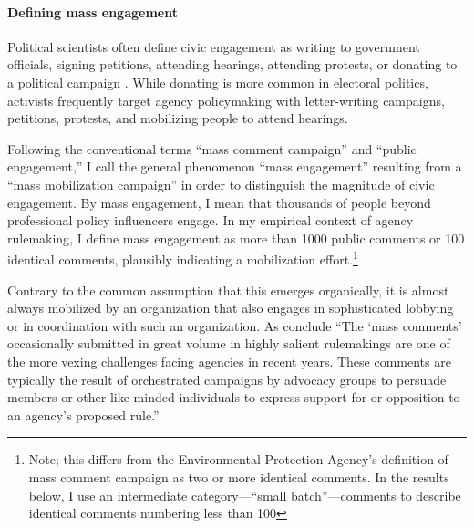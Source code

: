 \paragraph{Defining mass engagement}
Political scientists often define civic engagement as writing to government officials, signing petitions, attending hearings, attending protests, or donating to a political campaign \citep{Verba1987}. While donating is more common in electoral politics, activists frequently target agency policymaking with letter-writing campaigns, petitions, protests, and mobilizing people to attend hearings. 

Following the conventional terms ``mass comment campaign'' and ``public engagement,'' I call the general phenomenon ``mass engagement'' resulting from a ``mass mobilization campaign'' in order to distinguish the magnitude of civic engagement.
By mass engagement, I mean that thousands of people beyond professional policy influencers engage. In my empirical context of agency rulemaking, I define mass engagement as more than 1000 public comments or 100 identical comments, plausibly indicating a mobilization effort.\footnote{Note; this differs from the Environmental Protection Agency's definition of mass comment campaign as two or more identical comments. In the results below, I use an intermediate category---``small batch''---comments to describe identical comments numbering less than 100}  

Contrary to the common assumption that this emerges organically, it is almost always mobilized by an organization that also engages in sophisticated lobbying or in coordination with such an organization. %
As \citet{SantAmbrogio2018} conclude ``The `mass comments' occasionally submitted in great volume in highly salient rulemakings are one of the more vexing challenges facing agencies in recent years. These comments are typically the result of orchestrated campaigns by advocacy groups to persuade members or other like-minded individuals to express support for or opposition to an agency's proposed rule.'' %

